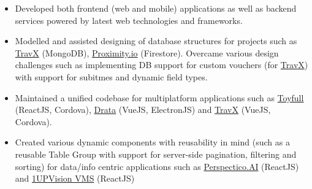 \documentclass[10pt,a4paper,ragged2e]{maltacv}
\begin{document}
\begin{itemize}
  \item Developed both frontend (web and mobile) applications as well as backend services powered by latest web technologies and frameworks.
  \item Modelled and assisted designing of database structures for projects such as \href{https://play.google.com/store/apps/details?id=com.travx.app}{TravX} (MongoDB), \href{https://prox.io/}{Proximity.io} (Firestore). Overcame various design challenges such as implementing DB support for custom vouchers (for \href{https://play.google.com/store/apps/details?id=com.travx.app}{TravX}) with support for subitmes and dynamic field types. 
  \item Maintained a unified codebase for multiplatform applications such as \href{https://toyfull-app.web.app/}{Toyfull} (ReactJS, Cordova), \href{https://drata.com/}{Drata} (VueJS, ElectronJS) and \href{https://play.google.com/store/apps/details?id=com.travx.app}{TravX} (VueJS, Cordova).
  \item Created various dynamic components with reusability in mind (such as a reusable Table Group with support for server-side pagination, filtering and sorting) for data/info centric applications such as \href{https://www.perspectico.com/}{Perspectico.AI} (ReactJS) and \href{https://www.1upvision.com/}{1UPVision VMS} (ReactJS)

\end{itemize}
\end{document}
